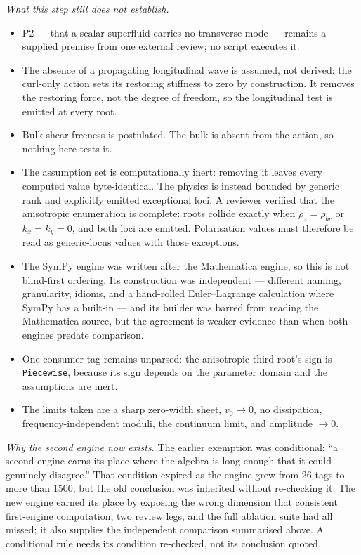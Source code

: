 \emph{What this step still does not establish.}
\begin{itemize}
\item P2 --- that a scalar superfluid carries no transverse mode --- remains a
supplied premise from one external review; no script executes it.
\item The absence of a propagating longitudinal wave is assumed, not derived:
the curl-only action sets its restoring stiffness to zero by construction. It
removes the restoring force, not the degree of freedom, so the longitudinal
test is emitted at every root.
\item Bulk shear-freeness is postulated. The bulk is absent from the action, so
nothing here tests it.
\item The assumption set is computationally inert: removing it leaves every
computed value byte-identical. The physics is instead bounded by generic rank
and explicitly emitted exceptional loci. A reviewer verified that the
anisotropic enumeration is complete: roots collide exactly when
\(\rho_z=\rho_{br}\) or \(k_x=k_y=0\), and both loci are emitted. Polarisation
values must therefore be read as generic-locus values with those exceptions.
\item The SymPy engine was written after the Mathematica engine, so this is not
blind-first ordering. Its construction was independent --- different naming,
granularity, idioms, and a hand-rolled Euler--Lagrange calculation where SymPy
has a built-in --- and its builder was barred from reading the Mathematica
source, but the agreement is weaker evidence than when both engines predate
comparison.
\item One consumer tag remains unparsed: the anisotropic third root's sign is
\texttt{Piecewise}, because its sign depends on the parameter domain and the
assumptions are inert.
\item The limits taken are a sharp zero-width sheet, \(v_0\to0\), no
dissipation, frequency-independent moduli, the continuum limit, and amplitude
\(\to0\).
\end{itemize}

\emph{Why the second engine now exists.} The earlier exemption was conditional:
``a second engine earns its place where the algebra is long enough that it
could genuinely disagree.'' That condition expired as the engine grew from 26
tags to more than 1500, but the old conclusion was inherited without
re-checking it. The new engine earned its place by exposing the wrong dimension
that consistent first-engine computation, two review legs, and the full
ablation suite had all missed; it also supplies the independent comparison
summarised above. A conditional rule needs its condition re-checked, not its
conclusion quoted.
